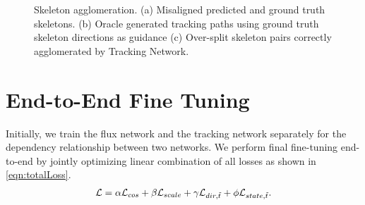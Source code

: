 \begin{figure}[t]
\begin{subfigure}[b]{\hwidth}
		\caption{}
		\label{fig:method_skel_agg_c}
	\end{subfigure}
	\caption{Skeleton agglomeration. (a) Misaligned predicted and ground truth skeletons. (b) Oracle generated tracking paths using ground truth skeleton directions as guidance (c) Over-split skeleton pairs correctly agglomerated by Tracking Network.}
	\label{fig:method_skel_agg}
	\vspace{-0.1in}
\end{figure}

\section{End-to-End Fine Tuning}
Initially, we train the flux network and the tracking network separately for the dependency relationship between two networks. We perform final fine-tuning end-to-end by jointly optimizing linear combination of all losses as shown in \autoref{eqn:totalLoss}.
\begin{align}
     \mathcal{L}= \alpha\mathcal{L}_{cos} + \beta\mathcal{L}_{scale} + \gamma\mathcal{L}_{dir, \Tilde{t}} + \phi\mathcal{L}_{state, \Tilde{t}}.\label{eqn:totalLoss}
\end{align}

